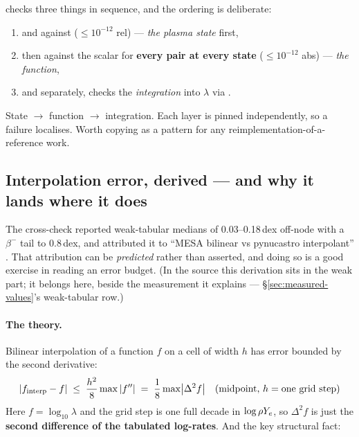  checks three things in
sequence, and the ordering is deliberate:

\begin{enumerate}
\item {} and  against 
      ($\le 10^{-12}$ rel) --- \emph{the plasma state} first,
\item then  against the scalar  for
      \textbf{every pair at every state} ($\le 10^{-12}$ abs) --- \emph{the
      function},
\item and separately,  checks the
      \emph{integration} into $\lambda$ via
      .
\end{enumerate}

State $\to$ function $\to$ integration. Each layer is pinned independently, so a
failure localises. Worth copying as a pattern for any
reimplementation-of-a-reference work.

\subsection{Interpolation error, derived --- and why it lands where it does}
\label{sec:interp-error}

The cross-check reported weak-tabular medians of 0.03--0.18\,dex off-node with a
$\beta^-$ tail to 0.8\,dex, and attributed it to ``MESA bilinear vs pynucastro
interpolant'' . That attribution can be \emph{predicted}
rather than asserted, and doing so is a good exercise in reading an error
budget. (In the source this derivation sits in the weak part; it belongs here,
beside the measurement it explains --- \S\ref{sec:measured-values}'s
weak-tabular row.)

\paragraph{The theory.} Bilinear interpolation of a function $f$ on a cell of
width $h$ has error bounded by the second derivative:
%
\begin{equation*}
|f_{\rm interp} - f| \;\le\; \frac{h^2}{8}\max|f''|
\;=\; \frac{1}{8}\max\bigl|\Delta^2 f\bigr|
\quad\text{(midpoint, } h = \text{one grid step)}
\end{equation*}
%
Here $f = \log_{10}\lambda$ and the grid step is one full decade in
$\log\rho Y_{e}$, so $\Delta^2 f$ is just the \textbf{second difference of the
tabulated log-rates}. And the key structural fact:

